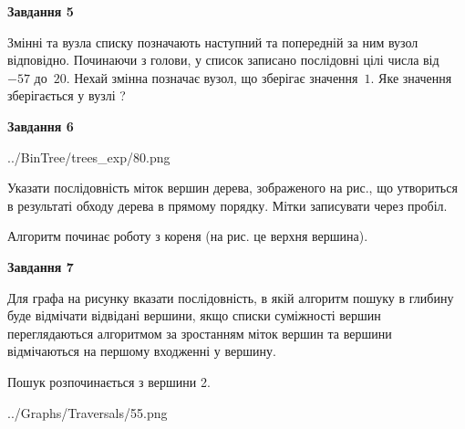 \documentclass[12pt, ukrainian]{article}
\begin{document}
{\begin {large}
{\begin {center}\textbf{Завдання 5}\end {center}}\par
Змінні  та  вузла списку позначають наступний та попередній за ним вузол відповідно. Починаючи з голови, у список записано послідовні цілі числа від~$-57$ до~$20$. Нехай змінна  позначає вузол, що зберігає значення~$1$.
Яке значення зберігається у вузлі  ?\par
\newpage

{\begin {center}\textbf{Завдання 6}\end {center}}\par

\begin{center}
	{../BinTree/trees_exp/80.png}
\end{center}
Указати послідовність міток вершин дерева, зображеного на рис., що утвориться в результаті обходу дерева в прямому порядку. Мітки записувати через пробіл.\par Алгоритм починає роботу з кореня (на рис. це верхня вершина).\par
\newpage

{\begin {center}\textbf{Завдання 7}\end {center}}\par
Для графа на рисунку вказати послідовність, в якій алгоритм пошуку в глибину буде відмічати відвідані вершини, якщо списки суміжності вершин переглядаються алгоритмом за зростанням міток вершин та вершини відмічаються на першому вход\-женні у вершину.\par
Пошук розпочинається з вершини 2.\par

\begin{center}
	{../Graphs/Traversals/55.png}
\end{center}\par
\newpage


\end{large}}
\end{document}
